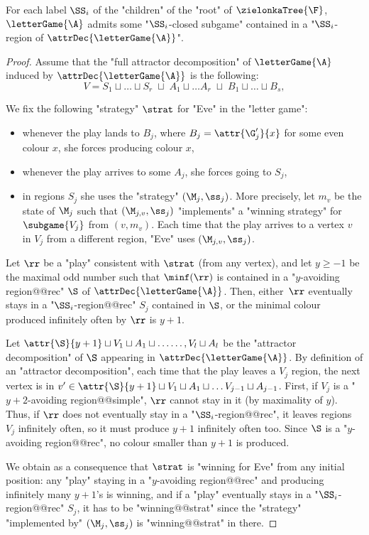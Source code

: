 \documentclass{theoretics}
\begin{document}
\begin{lemma}\label{lemma-ZT:existance-Ai-closed-regions}
	For each label $\SS_i$ of the "children" of the "root" of $\zielonkaTree{\F}$, $\letterGame{\A}$ admits some "$\SS_i$-closed subgame" contained in a "$\SS_i$-region of $\attrDec{\letterGame{\A}}$". 
\end{lemma}
\begin{proof}
	Assume that the "full attractor decomposition" of $\letterGame{\A}$ induced by $\attrDec{\letterGame{\A}}$ is the following:
	\[ V = S_1 \sqcup \dots \sqcup S_r \; \sqcup \; A_1\sqcup\dots A_r \; \sqcup \;  B_1\sqcup \dots \sqcup B_s,  \]
	
	We fix the following "strategy" $\strat$ for "Eve" in the "letter game": 
	\begin{itemize}
		\item whenever the play lands to $B_j$, where $B_j = \attr{\G_j'}{x}$ for some even colour $x$, she forces producing colour $x$,
		\item whenever the play arrives to some $A_j$, she forces going to $S_j$,
		\item in regions $S_j$ she uses the "strategy" $(\M_j, \ss_j)$. More precisely, let $m_v$ be the state of $\M_j$ such that $(\M_{j,v}, \ss_j)$ "implements" a "winning strategy" for $\subgame{V_j}$ from $(v,m_v)$. Each time that the play arrives to a vertex $v$ in $V_j$ from a different region, "Eve" uses $(\M_{j,v}, \ss_j)$.
	\end{itemize}

	\begin{claim}\label{claim-ZT:strat}
		Let $\rr$ be a "play" consistent with $\strat$ (from any vertex), and let $y\geq -1$ be the maximal odd number such that $\minf(\rr)$ is contained in a "$y$-avoiding region@@rec" $\S$ of $\attrDec{\letterGame{\A}}$. Then, either~$\rr$  eventually stays in a "$\SS_i$-region@@rec" $S_j$ contained in $\S$, or the minimal colour produced infinitely often by $\rr$ is $y+1$.
	\end{claim}
	\begin{subproof}
		Let $\attr{\S}{y+1}\sqcup V_1\sqcup A_1 \sqcup\dots \dots, V_l\sqcup A_l$ be the "attractor decomposition" of $\S$ appearing in $\attrDec{\letterGame{\A}}$.
		By definition of an "attractor decomposition", each time that the play leaves a $V_j$ region, the next vertex is in $v'\in \attr{\S}{y+1} \sqcup V_1 \sqcup A_1 \sqcup \dots  V_{j-1} \sqcup A_{j-1}$.  
		First, if $V_j$ is a "$y+2$-avoiding region@@simple", $\rr$ cannot stay in it (by maximality of $y$).
		Thus, if $\rr$ does not eventually stay in a "$\SS_i$-region@@rec", it leaves regions $V_j$ infinitely often, so it must %
		produce $y+1$ infinitely often too. Since $\S$ is a "$y$-avoiding region@@rec", no colour smaller than $y+1$ is produced.
	\end{subproof}
	We obtain as a consequence that $\strat$ is "winning for Eve" from any initial position: any "play" staying in a "$y$-avoiding region@@rec" and producing infinitely many $y+1$'s is winning, and if a "play" eventually stays in a "$\SS_i$-region@@rec" $S_j$, it has to be "winning@@strat" since the "strategy" "implemented by" $(\M_j, \ss_j)$ is "winning@@strat" in there.


\end{proof}
\end{document}
